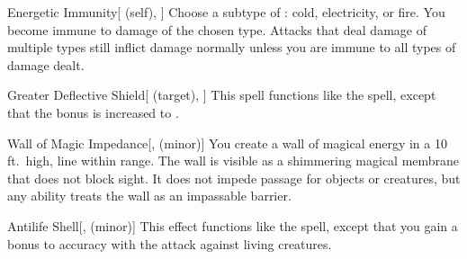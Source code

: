 \lowercase{\hypertarget{spell:Energetic Immunity}{}}\label{spell:Energetic Immunity}
\begin{attuneability}[\nth{4}]{\hypertarget{spell:Energetic Immunity}{Energetic Immunity}}[ (self), ]
Choose a subtype of : cold, electricity, or fire.
You become immune to damage of the chosen type.
Attacks that deal damage of multiple types still inflict damage normally unless you are immune to all types of damage dealt.
\end{attuneability}
\vspace{0.25em}



\lowercase{\hypertarget{spell:Greater Deflective Shield}{}}\label{spell:Greater Deflective Shield}
\begin{attuneability}[\nth{4}]{\hypertarget{spell:Greater Deflective Shield}{Greater Deflective Shield}}[ (target), ]
This spell functions like the  spell, except that the bonus is increased to .
\end{attuneability}
\vspace{0.25em}



\lowercase{\hypertarget{spell:Wall of Magic Impedance}{}}\label{spell:Wall of Magic Impedance}
\begin{freeability}[\nth{4}]{\hypertarget{spell:Wall of Magic Impedance}{Wall of Magic Impedance}}[,  (minor)]
\targetrule
You create a wall of magical energy in a 10 ft.\ high, \areamed line within \rngmed range.
The wall is visible as a shimmering magical membrane that does not block sight.
It does not impede passage for objects or creatures, but any  ability treats the wall as an impassable barrier.
\end{freeability}
\vspace{0.25em}



\lowercase{\hypertarget{spell:Antilife Shell}{}}\label{spell:Antilife Shell}
\begin{freeability}[\nth{5}]{\hypertarget{spell:Antilife Shell}{Antilife Shell}}[,  (minor)]
This effect functions like the  spell, except that you gain a  bonus to accuracy with the attack against living creatures.
\end{freeability}
\vspace{0.25em}



